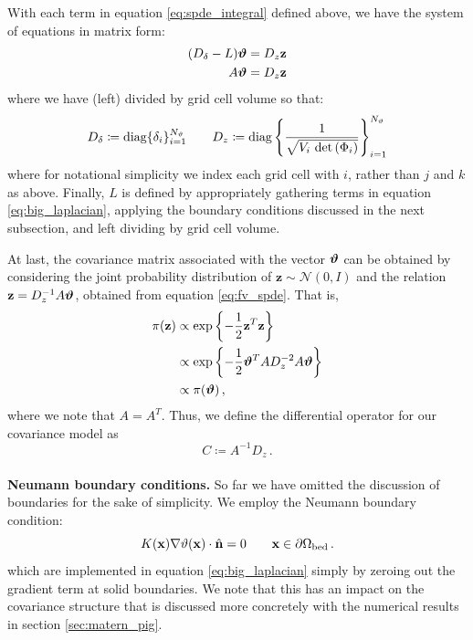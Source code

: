 With each term in equation \eqref{eq:spde_integral} defined above, we have the system of
equations in matrix form:
\begin{equation}
    \begin{aligned}
        (D_\delta - L) \bm{\vartheta} &= D_z\mathbf{z}\\
        A\bm{\vartheta} &= D_z\mathbf{z}
    \end{aligned}
    \label{eq:fv_spde}
\end{equation}
where we have (left) divided by grid cell volume so that:
\begin{equation*}
    \begin{aligned}
        D_\delta \coloneqq \text{diag}\{\delta_i\}_{i=1}^{N_{\vartheta}} \qquad
        D_z \coloneqq \text{diag}\left\{
            \dfrac{1}{\sqrt{V_i \,\, \text{det}\left(\Phi_{i}\right)}}
            \right\}_{i=1}^{N_{\vartheta}}
    \end{aligned}
\end{equation*}
where for notational simplicity we index each grid cell with $i$, rather than
$j$ and $k$ as above.
Finally, $L$ is defined by appropriately gathering terms in
equation \eqref{eq:big_laplacian}, applying the boundary conditions discussed in the next
subsection, and left dividing by grid cell volume.

At last, the covariance matrix associated with the vector $\bm{\vartheta}$ can be
obtained by considering the joint probability distribution of
$\mathbf{z}\sim\mathcal{N}(0,I)$ and
the relation $\mathbf{z} = D_z^{-1}A\bm{\vartheta}$, obtained from
equation \eqref{eq:fv_spde}.
That is,
\begin{equation*}
    \begin{aligned}
        \pi(\mathbf{z})
        &\propto  \exp\left\{-\dfrac{1}{2}\mathbf{z}^T\mathbf{z}\right\} \\
        &\propto \exp\left\{-\dfrac{1}{2}\bm{\vartheta}^T A D_z^{-2} A \bm{\vartheta}\right\} \\
        &\propto \pi(\bm{\vartheta}) \, ,
    \end{aligned}
\end{equation*}
where we note that $A=A^T$.
Thus, we define the differential operator for our covariance model as
\begin{equation*}
    C \coloneqq A^{-1} D_z \, .
\end{equation*}
\\

\noindent\textbf{Neumann boundary conditions.}
So far we have omitted the discussion of boundaries for the sake of
simplicity.
We employ the Neumann boundary condition:
\begin{equation*}
    K(\mathbf{x})\nabla\vartheta(\mathbf{x}) \cdot \hat{\mathbf{n}} = 0 \qquad \mathbf{x}\in\partial\Omega_{\text{bed}} \, .
\end{equation*}
which are implemented in equation \eqref{eq:big_laplacian}
simply by zeroing out the gradient term at solid boundaries.
We note that this has an impact on the covariance structure that is discussed
more concretely with the numerical results in
section \ref{sec:matern_pig}.\\

